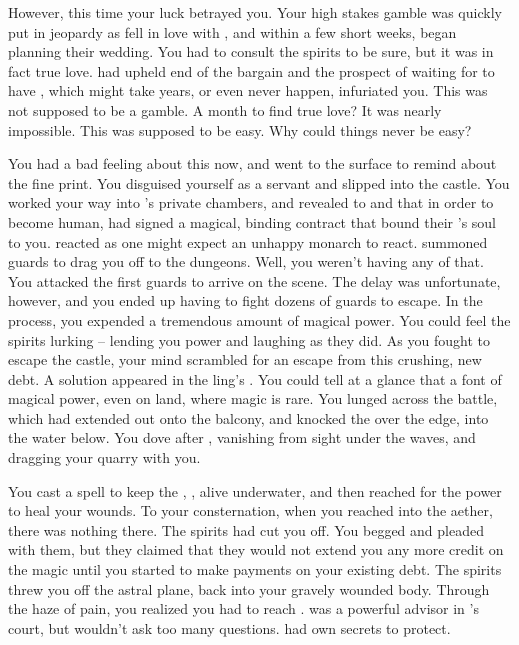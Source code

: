 \documentclass[char]{NeptuneBall}
\begin{document}
However, this time your luck betrayed you. Your high stakes gamble was quickly put in jeopardy as \cEric{} fell in love with \cAriel{}, and within a few short weeks, began planning their wedding. You had to consult the spirits to be sure, but it was in fact true love. \cAriel{} had upheld \cAriel{\their} end of the bargain and the prospect of waiting for \cAriel{\them} to have \cWillow{\anotherchild}, which might take years, or even never happen, infuriated you. This was not supposed to be a gamble. A month to find true love? It was nearly impossible. This was supposed to be easy. Why could things never be easy?

You had a bad feeling about this now, and went to the surface to remind \cAriel{} about the fine print. You disguised yourself as a servant and slipped into the castle. You worked your way into \cEric{}'s private chambers, and revealed to \cAriel{} and \cEric{} that in order to become human, \cAriel{} had signed a magical, binding contract that bound their \cWillow{\nextborn}'s soul to you. \cEric{} reacted as one might expect an unhappy monarch to react. \cEric{\They} summoned \cEric{\their} guards to drag you off to the dungeons. Well, you weren't having any of that. You attacked the first guards to arrive on the scene. The delay was unfortunate, however, and you ended up having to fight dozens of guards to escape. In the process, you expended a tremendous amount of magical power. You could feel the spirits lurking -- lending you power and laughing as they did. As you fought to escape the castle, your mind scrambled for an escape from this crushing, new debt. A solution appeared in the \cEric{\prince}ling's \cSlave{\sibling}. You could tell at a glance that \cSlave{\they} \cSlave{\were} a font of magical power, even on land, where magic is rare. You lunged across the battle, which had extended out onto the balcony, and knocked the \cSlave{\kid} over the edge, into the water below. You dove after \cSlave{\them}, vanishing from sight under the waves, and dragging your quarry with you.

You cast a spell to keep the \cSlave{\kid}, \cSlave{}, alive underwater, and then reached for the power to heal your wounds. To your consternation, when you reached into the aether, there was nothing there. The spirits had cut you off. You begged and pleaded with them, but they claimed that they would not extend you any more credit on the magic until you started to make payments on your existing debt. The spirits threw you off the astral plane, back into your gravely wounded body. Through the haze of pain, you realized you had to reach \cManta{}. \cManta{} was a powerful advisor in \cKing{}'s court, but \cManta{\they} wouldn't ask too many questions. \cManta{\They} had \cManta{\their} own secrets to protect.
\end{document}
